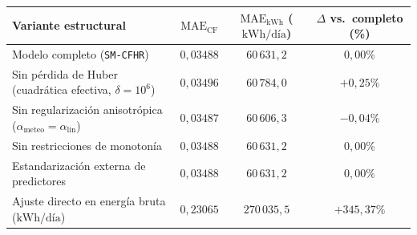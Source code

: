 \begin{tabular}{@{}lccc@{}}
\toprule
Variante estructural & $\mathrm{MAE}_{\mathrm{CF}}$ & $\mathrm{MAE}_{\mathrm{kWh}}$ ($\text{kWh/día}$) & $\Delta$ vs.\ completo (\%) \\
\midrule
Modelo completo (\texttt{SM-CFHR}) & $0{,}03488$ & $60\,631{,}2$ & $0{,}00\%$ \\
Sin pérdida de Huber (cuadrática efectiva, $\delta = 10^6$) & $0{,}03496$ & $60\,784{,}0$ & $+0{,}25\%$ \\
Sin regularización anisotrópica ($\alpha_{\mathrm{meteo}}=\alpha_{\mathrm{lin}}$) & $0{,}03487$ & $60\,606{,}3$ & $-0{,}04\%$ \\
Sin restricciones de monotonía & $0{,}03488$ & $60\,631{,}2$ & $0{,}00\%$ \\
Estandarización externa de predictores & $0{,}03488$ & $60\,631{,}2$ & $0{,}00\%$ \\
Ajuste directo en energía bruta ($\text{kWh/día}$) & $0{,}23065$ & $270\,035{,}5$ & $+345{,}37\%$ \\
\bottomrule
\end{tabular}
